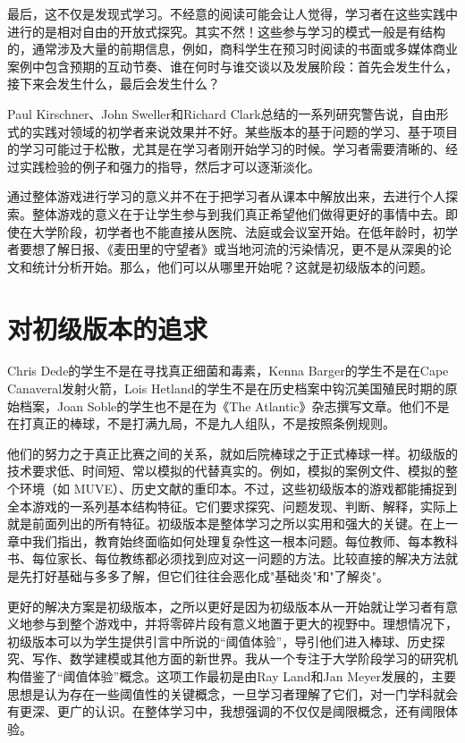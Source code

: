 最后，这不仅是发现式学习。不经意的阅读可能会让人觉得，学习者在这些实践中进行的是相对自由的开放式探究。其实不然！这些参与学习的模式一般是有结构的，通常涉及大量的前期信息，例如，商科学生在预习时阅读的书面或多媒体商业案例中包含预期的互动节奏、谁在何时与谁交谈以及发展阶段：首先会发生什么，接下来会发生什么，最后会发生什么？

Paul Kirschner、John Sweller和Richard Clark总结的一系列研究警告说，自由形式的实践对领域的初学者来说效果并不好。某些版本的基于问题的学习、基于项目的学习可能过于松散，尤其是在学习者刚开始学习的时候。学习者需要清晰的、经过实践检验的例子和强力的指导，然后才可以逐渐淡化。

通过整体游戏进行学习的意义并不在于把学习者从课本中解放出来，去进行个人探索。整体游戏的意义在于让学生参与到我们真正希望他们做得更好的事情中去。即使在大学阶段，初学者也不能直接从医院、法庭或会议室开始。在低年龄时，初学者要想了解日报、《麦田里的守望者》或当地河流的污染情况，更不是从深奥的论文和统计分析开始。那么，他们可以从哪里开始呢？这就是初级版本的问题。

\section*{对初级版本的追求}

Chris Dede的学生不是在寻找真正细菌和毒素，Kenna Barger的学生不是在Cape Canaveral发射火箭，Lois Hetland的学生不是在历史档案中钩沉美国殖民时期的原始档案，Joan Soble的学生也不是在为《The Atlantic》杂志撰写文章。他们不是在打真正的棒球，不是打满九局，不是九人组队，不是按照条例规则。

他们的努力之于真正比赛之间的关系，就如后院棒球之于正式棒球一样。初级版的技术要求低、时间短、常以模拟的代替真实的。例如，模拟的案例文件、模拟的整个环境（如 MUVE）、历史文献的重印本。不过，这些初级版本的游戏都能捕捉到全本游戏的一系列基本结构特征。它们要求探究、问题发现、判断、解释，实际上就是前面列出的所有特征。初级版本是整体学习之所以实用和强大的关键。在上一章中我们指出，教育始终面临如何处理复杂性这一根本问题。每位教师、每本教科书、每位家长、每位教练都必须找到应对这一问题的方法。比较直接的解决方法就是先打好基础与多多了解，但它们往往会恶化成"基础炎"和"了解炎"。

更好的解决方案是初级版本，之所以更好是因为初级版本从一开始就让学习者有意义地参与到整个游戏中，并将零碎片段有意义地置于更大的视野中。理想情况下，初级版本可以为学生提供引言中所说的“阈值体验”，导引他们进入棒球、历史探究、写作、数学建模或其他方面的新世界。我从一个专注于大学阶段学习的研究机构借鉴了“阈值体验”概念。这项工作最初是由Ray Land和Jan Meyer发展的，主要思想是认为存在一些阈值性的关键概念，一旦学习者理解了它们，对一门学科就会有更深、更广的认识。在整体学习中，我想强调的不仅仅是阈限概念，还有阈限体验。

